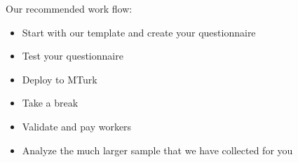 \documentclass[aspectratio=169]{beamer}
\begin{document}
%
\begin{frame}

Our recommended work flow:
\begin{itemize}
\item Start with our template and create your questionnaire
\item Test your questionnaire
\item Deploy to MTurk
\item Take a break
\item Validate and pay workers
\item Analyze the much larger sample that we have collected for you
\end{itemize}

\end{frame}
%
%
%
%
%
%
%
%
%
\end{document}
